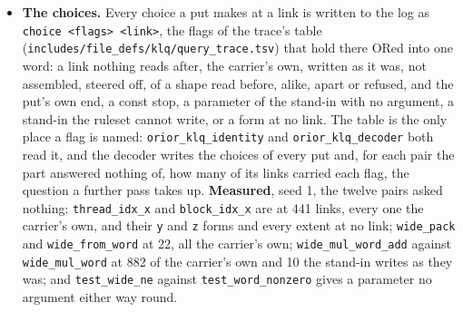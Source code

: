 \begin{itemize}
\item \textbf{The choices.} Every choice a put makes at a link is written to the log as \texttt{choice <flags> <link>}, the flags of the trace's table (\texttt{includes/\allowbreak{}file\_\allowbreak{}defs/\allowbreak{}klq/\allowbreak{}query\_\allowbreak{}trace.\allowbreak{}tsv}) that hold there ORed into one word: a link nothing reads after, the carrier's own, written as it was, not assembled, steered off, of a shape read before, alike, apart or refused, and the put's own end, a const stop, a parameter of the stand-in with no argument, a stand-in the ruleset cannot write, or a form at no link. The table is the only place a flag is named: \texttt{orior\_\allowbreak{}klq\_\allowbreak{}identity} and \texttt{orior\_\allowbreak{}klq\_\allowbreak{}decoder} both read it, and the decoder writes the choices of every put and, for each pair the part answered nothing of, how many of its links carried each flag, the question a further pass takes up. \textbf{Measured}, seed 1, the twelve pairs asked nothing: \texttt{thread\_\allowbreak{}idx\_\allowbreak{}x} and \texttt{block\_\allowbreak{}idx\_\allowbreak{}x} are at 441 links, every one the carrier's own, and their \texttt{y} and \texttt{z} forms and every extent at no link; \texttt{wide\_\allowbreak{}pack} and \texttt{wide\_\allowbreak{}from\_\allowbreak{}word} at 22, all the carrier's own; \texttt{wide\_\allowbreak{}mul\_\allowbreak{}word\_\allowbreak{}add} against \texttt{wide\_\allowbreak{}mul\_\allowbreak{}word} at 882 of the carrier's own and 10 the stand-in writes as they was; and \texttt{test\_\allowbreak{}wide\_\allowbreak{}ne} against \texttt{test\_\allowbreak{}word\_\allowbreak{}nonzero} gives a parameter no argument either way round.

\end{itemize}
